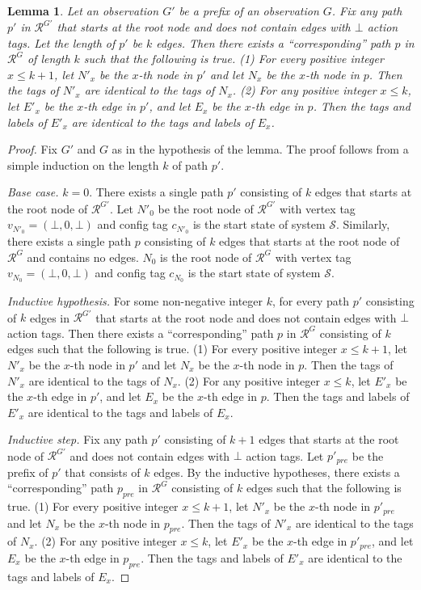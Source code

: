 \documentclass[11pt]{article}
\numberwithin{theorem}{section}
\newtheorem{lemma}[theorem]{Lemma}
\begin{document}
\begin{lemma}\label{lem:prefixObsYieldsSubtree}
Let an observation $G'$ be a prefix of an observation $G$. Fix any path $p'$ in $\mathcal{R}^{G'}$ that starts at the root node and does not contain edges with $\bot$ action tags. Let the length of $p'$ be $k$ edges. Then there exists a ``corresponding'' path $p$ in $\mathcal{R}^G$ of length $k$ such that the following is true. 
(1) For every positive integer $x \leq k+1$, let $N'_x$ be the $x$-th node in $p'$ and let $N_x$ be the $x$-th node in $p$. Then the tags of $N'_x$ are identical to the tags of $N_x$. (2) For any positive integer $x \leq k$, let $E'_x$ be the $x$-th edge in $p'$, and let $E_x$ be the $x$-th edge in $p$. Then the tags and labels of $E'_x$ are identical to the tags and labels of $E_x$.
\end{lemma}
\begin{proof}
Fix $G'$ and $G$ as in the hypothesis of the lemma. The proof follows from a simple induction on the length $k$ of path $p'$.

\emph{Base case.} $k=0$. There exists a single path $p'$ consisting of $k$ edges that starts at the root node of $\mathcal{R}^{G'}$. Let $N'_0$ be the root node of $\mathcal{R}^{G'}$ with vertex tag $v_{N'_0} = (\bot, 0, \bot)$ and config tag $c_{N'_0}$ is the start state of  system $\mathcal{S}$. Similarly, there exists a single path $p$ consisting of $k$ edges that starts at the root node of $\mathcal{R}^G$ and contains no edges. $N_0$ is the root node of $\mathcal{R}^G$ with vertex tag $v_{N_0}= (\bot, 0, \bot)$ and config tag $c_{N_0}$ is the start state of  system $\mathcal{S}$.

\emph{Inductive hypothesis.} For some non-negative integer $k$, for every path $p'$ consisting of $k$ edges in $\mathcal{R}^{G'}$ that starts at the root node and does not contain edges with $\bot$ action tags. Then there exists a ``corresponding'' path $p$ in $\mathcal{R}^G$ consisting of $k$ edges such that the following is true. 
(1) For every positive integer $x \leq k+1$, let $N'_x$ be the $x$-th node in $p'$ and let $N_x$ be the $x$-th node in $p$. Then the tags of $N'_x$ are identical to the tags of $N_x$. (2) For any positive integer $x \leq k$, let $E'_x$ be the $x$-th edge in $p'$, and let $E_x$ be the $x$-th edge in $p$. Then the tags and labels of $E'_x$ are identical to the tags and labels of $E_x$.

\emph{Inductive step.} Fix any path $p'$ consisting of $k+1$ edges that starts at the root node of $\mathcal{R}^{G'}$ and does not contain edges with $\bot$ action tags. Let $p'_{pre}$ be the prefix of $p'$ that consists of $k$ edges. By the inductive hypotheses, there exists a ``corresponding'' path $p_{pre}$ in $\mathcal{R}^G$ consisting of $k$ edges such that the following is true. 
(1) For every positive integer $x \leq k+1$, let $N'_x$ be the $x$-th node in $p'_{pre}$ and let $N_x$ be the $x$-th node in $p_{pre}$. Then the tags of $N'_x$ are identical to the tags of $N_x$. (2) For any positive integer $x \leq k$, let $E'_x$ be the $x$-th edge in $p'_{pre}$, and let $E_x$ be the $x$-th edge in $p_{pre}$. Then the tags and labels of $E'_x$ are identical to the tags and labels of $E_x$.


\end{proof}
\end{document}
